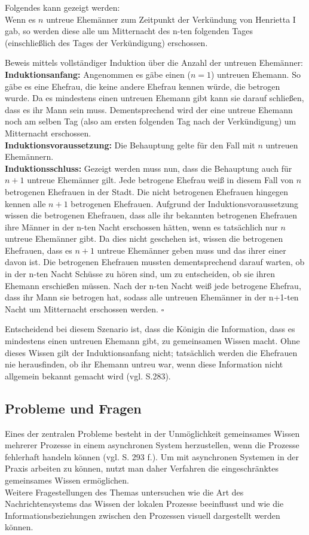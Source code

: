 Folgendes kann gezeigt werden:\\
Wenn es $n$ untreue Ehemänner zum Zeitpunkt der Verkündung von Henrietta I gab, so werden diese alle um Mitternacht des n-ten folgenden Tages (einschließlich des Tages der Verkündigung) erschossen.\medskip

Beweis mittels vollständiger Induktion über die Anzahl der untreuen Ehemänner:\\
\textbf{Induktionsanfang:} Angenommen es gäbe einen ($n=1$) untreuen Ehemann. So gäbe es eine Ehefrau, die keine andere Ehefrau kennen würde, die betrogen wurde. Da es mindestens einen untreuen Ehemann gibt kann sie darauf schließen, dass es ihr Mann sein muss. Dementsprechend wird der eine untreue Ehemann noch am selben Tag (also am ersten folgenden Tag nach der Verkündigung) um Mitternacht erschossen.\\
\textbf{Induktionsvoraussetzung:} Die Behauptung gelte für den Fall mit $n$ untreuen Ehemännern.\\
\textbf{Induktionsschluss:} Gezeigt werden muss nun, dass die Behauptung auch für $n+1$ untreue Ehemänner gilt.
Jede betrogene Ehefrau weiß in diesem Fall von $n$ betrogenen Ehefrauen in der Stadt. Die nicht betrogenen Ehefrauen hingegen kennen alle $n+1$ betrogenen Ehefrauen.
Aufgrund der Induktionsvoraussetzung wissen die betrogenen Ehefrauen, dass alle ihr bekannten betrogenen Ehefrauen ihre Männer in der n-ten Nacht erschossen hätten, wenn es tatsächlich nur $n$ untreue Ehemänner gibt.
Da dies nicht geschehen ist, wissen die betrogenen Ehefrauen, dass es $n+1$ untreue Ehemänner geben muss und das ihrer einer davon ist.
Die betrogenen Ehefrauen mussten dementsprechend darauf warten, ob in der n-ten Nacht Schüsse zu  hören sind, um zu entscheiden, ob sie ihren Ehemann erschießen müssen.
Nach der n-ten Nacht weiß jede betrogene Ehefrau, dass ihr Mann sie betrogen hat, sodass alle untreuen Ehemänner in der n+1-ten Nacht um Mitternacht erschossen werden. $\square$

Entscheidend bei diesem Szenario ist, dass die Königin die Information, dass es mindestens einen untreuen Ehemann gibt, zu gemeinsamen Wissen macht.
Ohne dieses Wissen gilt der Induktionsanfang nicht; tatsächlich werden die Ehefrauen nie herausfinden, ob ihr Ehemann untreu war, wenn diese Information nicht allgemein bekannt gemacht wird (vgl. \cite{kshemkalyani2011distributed} S.283).

\subsection{Probleme und Fragen}
Eines der zentralen Probleme besteht in der Unmöglichkeit gemeinsames Wissen mehrerer Prozesse in einem asynchronen System herzustellen, wenn die Prozesse fehlerhaft handeln können (vgl.\cite{kshemkalyani2011distributed} S. 293 f.). Um mit asynchronen Systemen in der Praxis arbeiten zu können, nutzt man daher Verfahren die eingeschränktes gemeinsames Wissen ermöglichen.\\
Weitere Fragestellungen des Themas untersuchen wie die Art des Nachrichtensystems das Wissen der lokalen Prozesse beeinflusst und wie die Informationsbeziehungen zwischen den Prozessen visuell dargestellt werden können.

